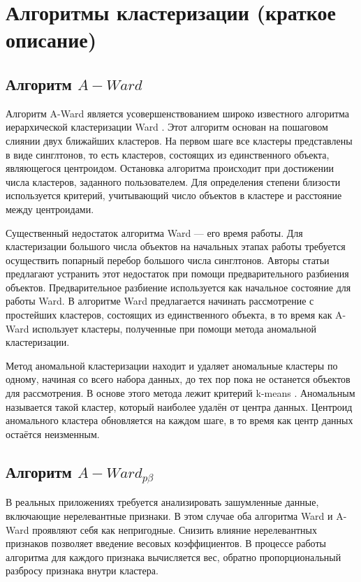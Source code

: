 \documentclass[12pt,twoside,a4paper,tikz,border=5]{refart}
\begin{document}
\section{Алгоритмы кластеризации (краткое описание)}
\label{sec:algs}
\subsection{Алгоритм $ A-Ward $}
\label{subsec:a-ward}
Алгоритм A-Ward является усовершенствованием  широко известного алгоритма иерархической кластеризации Ward \cite{ward}. Этот алгоритм основан на пошаговом слиянии двух ближайших кластеров. На первом шаге все кластеры представлены в виде синглтонов, то есть кластеров, состоящих из единственного объекта, являющегося центроидом. Остановка алгоритма происходит при достижении числа кластеров, заданного пользователем. Для определения степени близости используется критерий, учитывающий число объектов в кластере и расстояние между центроидами.

Существенный недостаток алгоритма Ward --- его время работы. Для кластеризации большого числа объектов на начальных этапах работы требуется осуществить попарный перебор большого числа синглтонов. Авторы статьи \cite{amorim} предлагают устранить этот недостаток при помощи предварительного разбиения объектов. Предварительное разбиение используется как начальное состояние для работы Ward. В алгоритме Ward предлагается начинать рассмотрение с простейших кластеров, состоящих из единственного объекта, в то время как A-Ward использует кластеры, полученные при помощи метода аномальной кластеризации. 

Метод аномальной кластеризации находит и удаляет аномальные кластеры по одному, начиная со всего набора данных, до тех пор пока не останется объектов для рассмотрения. В основе этого метода лежит критерий k-means \cite{k-means}. Аномальным называется такой кластер, который наиболее удалён от центра данных. Центроид аномального кластера обновляется на каждом шаге, в то время как центр данных остаётся неизменным.

\subsection{Алгоритм $ A-Ward_{p\beta} $}
В реальных приложениях требуется анализировать зашумленные данные, включающие нерелевантные признаки. В этом случае оба алгоритма Ward и A-Ward проявляют себя как непригодные. Снизить влияние нерелевантных признаков позволяет введение весовых коэффициентов. В процессе работы алгоритма для каждого признака вычисляется вес, обратно пропорциональный разбросу признака внутри кластера.
\end{document}
